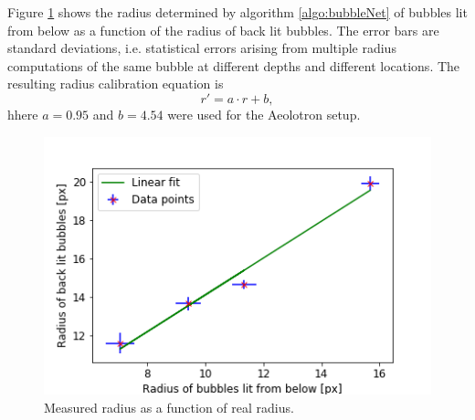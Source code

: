 			Figure \ref{fig:radius_calib_result} shows the radius determined by algorithm \ref{algo:bubbleNet} of bubbles lit from below as a function of the radius of back lit bubbles. The error bars are standard deviations, i.e. statistical errors arising from multiple radius computations of the same bubble at different depths and different locations. The resulting radius calibration equation is 
			\begin{equation}
				r' = a \cdot r + b,
				\label{eq:radius_calib}
			\end{equation}
			hhere $a= 0.95$ and $b=4.54$ were used for the Aeolotron setup. 
			
			\begin{figure}[h]
				\centering
				\includegraphics[scale=.6]{graphs/radius_calibration_result.png}
				\caption{Measured radius as a function of real radius.}
				\label{fig:radius_calib_result}
			\end{figure}
			
			
			
			
			
































